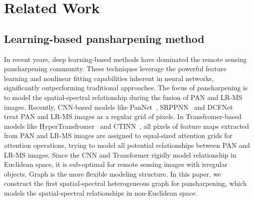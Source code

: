 \section{Related Work}
\subsection{Learning-based pansharpening method}

In recent years, deep learning-based methods have dominated the remote sensing pansharpening community. These techniques leverage the powerful feature learning and nonlinear fitting capabilities inherent in neural networks, significantly outperforming traditional approaches. The focus of pansharpening is to model the spatial-spectral relationship during the fusion of PAN and LR-MS images. Recently, CNN-based models like PanNet~\cite{yang2017pannet}, SRPPNN~\cite{cai2020super} and DCFNet~\cite{Wu_Huang_Deng_Zhang_2022} treat PAN and LR-MS images as a regular grid of pixels. In Transfromer-based models like HyperTransfromer~\cite{bandara2022hypertransformer} and CTINN~\cite{zhou2022panformer}, all pixels of feature maps extracted from PAN and LR-MS images are assigned to equal-sized attention grids
for attention operations, trying to model all potential relationships between PAN and LR-MS images. Since the CNN and Transformer rigidly model relationship in Euclidean space, it is sub-optimal for remote sensing images with irregular objects. Graph is the more flexible modeling structure. In this paper, we construct the first spatial-spectral heterogeneous graph for pansharpening, which models the spatial-spectral relationships in non-Euclidean space.

